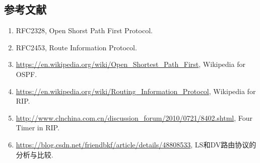 \documentclass[15pt]{ctexart}
\begin{document}
\newpage
\begin{appendices}
    \section{参考文献} %
        \begin{enumerate}
        \item RFC2328, Open Shorst Path First Protocol.
        \item RFC2453, Route Information Protocol.
        \item \url{https://en.wikipedia.org/wiki/Open_Shortest_Path_First}, Wikipedia for OSPF.
        \item \url{https://en.wikipedia.org/wiki/Routing_Information_Protocol}, Wikipedia for RIP.
        \item \url{http://www.clnchina.com.cn/discussion_forum/2010/0721/8402.shtml}, Four Timer in RIP.
        \item \url{https://blog.csdn.net/friendbkf/article/details/48808533}, LS和DV路由协议的分析与比较.
        \end{enumerate}
\end{appendices}
\end{document}
